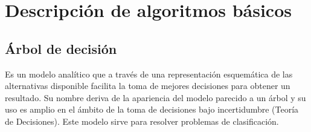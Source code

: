 \documentclass[12pt]{report}
\renewcommand{\_}{\kern-1.5pt\textunderscore\kern-1.5pt}
\begin{document}
\vspace{\baselineskip}

\vspace{\baselineskip}

\vspace{\baselineskip}

\vspace{\baselineskip}

\vspace{\baselineskip}

\vspace{\baselineskip}

\vspace{\baselineskip}

\vspace{\baselineskip}

\vspace{\baselineskip}

\vspace{\baselineskip}

\vspace{\baselineskip}

\vspace{\baselineskip}

\vspace{\baselineskip}

\vspace{\baselineskip}

\vspace{\baselineskip}

\vspace{\baselineskip}
\section{Descripción de algoritmos básicos}

\vspace{\baselineskip}

\vspace{\baselineskip}

\vspace{\baselineskip}
\subsection{Árbol de decisión}
Es un modelo analítico que a través de una representación esquemática de las alternativas disponible facilita la toma de mejores decisiones para obtener un resultado. Su nombre deriva de la apariencia del modelo parecido a un árbol y su uso es amplio en el ámbito de la toma de decisiones bajo incertidumbre (Teoría de Decisiones).
Este modelo sirve para resolver problemas de clasificación.
\end{document}
